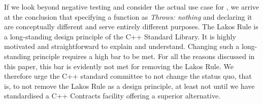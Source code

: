 If we look beyond negative testing and consider the actual use case for , we arrive at the conclusion that specifying a function as \emph{Throws: nothing} and declaring it  are conceptually different and serve entirely different purposes. The Lakos Rule is a long-standing design principle of the C++ Standard Library. It is highly motivated and straightforward to explain and understand. Changing such a long-standing principle requires a high bar to be met. For all the reasons discussed in this paper, this bar is evidently not met for removing the Lakos Rule. We therefore urge the C++ standard committee to not change the status quo, that is, to not remove the Lakos Rule as a design principle, at least not until we have standardised a C++ Contracts facility offering a superior alternative.





\renewcommand{\bibname}{References}




